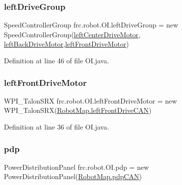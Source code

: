 \subsubsection{\texorpdfstring{left\+Drive\+Group}{leftDriveGroup}}
{\footnotesize\ttfamily Speed\+Controller\+Group frc.\+robot.\+O\+I.\+left\+Drive\+Group = new Speed\+Controller\+Group(\hyperlink{classfrc_1_1robot_1_1_o_i_a8c33a9f0b9e366e48abd23ab01907e18}{left\+Center\+Drive\+Motor}, \hyperlink{classfrc_1_1robot_1_1_o_i_a88080d092baf8ece2c22f2ceec4f6f8f}{left\+Back\+Drive\+Motor},\hyperlink{classfrc_1_1robot_1_1_o_i_a3f39e281419ebd60b94126e87e3ec81d}{left\+Front\+Drive\+Motor})\hspace{0.3cm}{\ttfamily [static]}}



Definition at line 46 of file O\+I.\+java.

\mbox{\label{classfrc_1_1robot_1_1_o_i_a3f39e281419ebd60b94126e87e3ec81d}} 
\subsubsection{\texorpdfstring{left\+Front\+Drive\+Motor}{leftFrontDriveMotor}}
{\footnotesize\ttfamily W\+P\+I\+\_\+\+Talon\+S\+RX frc.\+robot.\+O\+I.\+left\+Front\+Drive\+Motor = new W\+P\+I\+\_\+\+Talon\+S\+RX(\hyperlink{classfrc_1_1robot_1_1_robot_map_a2e3dbfb148d6fa2b7f430614887217f0}{Robot\+Map.\+left\+Front\+Drive\+C\+AN})\hspace{0.3cm}{\ttfamily [static]}}



Definition at line 36 of file O\+I.\+java.

\mbox{\label{classfrc_1_1robot_1_1_o_i_a98d90326dfdaf14238d2f81c20c55f3f}} 
\subsubsection{\texorpdfstring{pdp}{pdp}}
{\footnotesize\ttfamily Power\+Distribution\+Panel frc.\+robot.\+O\+I.\+pdp = new Power\+Distribution\+Panel(\hyperlink{classfrc_1_1robot_1_1_robot_map_af7db1426412719318df15f9838b70198}{Robot\+Map.\+pdp\+C\+AN})\hspace{0.3cm}{\ttfamily [static]}}



